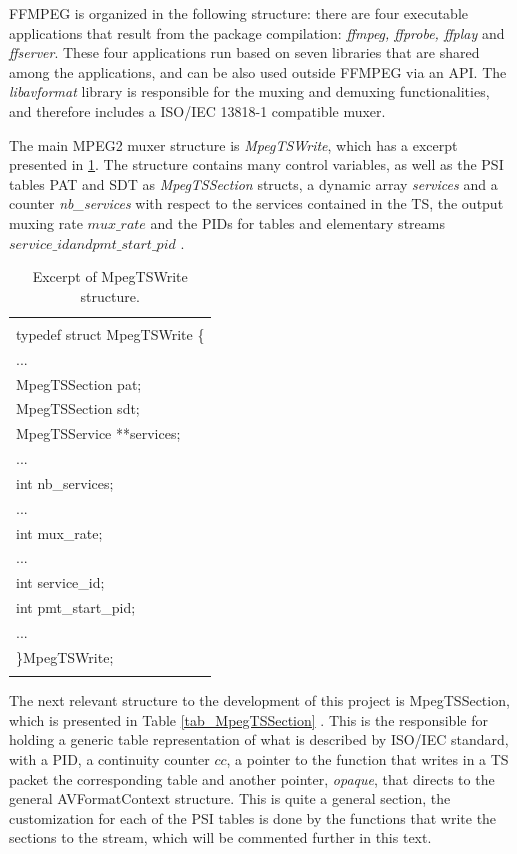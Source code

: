 \documentclass[
	12pt,				%
	openright,			%
	twoside,			%
	a4paper,			%
	brazil,
	french,				%
	english
	]{abntex2}
\begin{document}
FFMPEG is organized in the following structure: there are four executable applications that result from the package compilation: \textit{ffmpeg, ffprobe, ffplay} and \textit{ffserver}. These four applications run based on seven libraries that are shared among the applications, and can be also used outside FFMPEG via an API. The \textit{libavformat} library is responsible for the muxing and demuxing functionalities, and therefore includes a ISO/IEC 13818-1 compatible muxer.

The main MPEG2 muxer structure is \textit{MpegTSWrite}, which has a excerpt presented in \ref{tab_MpegTSWrite}. The structure contains many control variables, as well as the PSI tables PAT and SDT as \textit{MpegTSSection} structs, a dynamic array \textit{services} and a counter \textit{nb\_services} with respect to the services contained in the TS, the output muxing rate \( \textit{mux\_rate} \) and the PIDs for tables and elementary streams \( \textit{service\_id} and \textit{pmt\_start\_pid} \) .

\begin{table}[!htpd]
\label{tab_MpegTSWrite}
\caption{ Excerpt of MpegTSWrite structure.}
\begin{center}
\begin{tabular}{|l|}
\hline
\\
typedef struct MpegTSWrite \{\\
...\\
MpegTSSection pat;\\
MpegTSSection sdt;\\
MpegTSService **services;\\
...\\
int nb\_services;\\
...\\
int mux\_rate;\\
...\\
int service\_id;\\
int pmt\_start\_pid;\\
...\\
 \}MpegTSWrite;\\
 \\
\hline
\end{tabular}
\end{center}
\end{table}

The next relevant structure to the development of this project is MpegTSSection, which is presented in Table \ref{tab_MpegTSSection} . This is the responsible for holding a generic table representation of what is described by ISO/IEC standard, with a PID, a continuity counter \(\textit{cc}\), a pointer to the function that writes in a TS packet the corresponding table and another pointer, \textit{opaque}, that directs to the general AVFormatContext structure. This is quite a general section, the customization for each of the PSI tables is done by the functions that write the sections to the stream, which will be commented further in this text.
\end{document}
